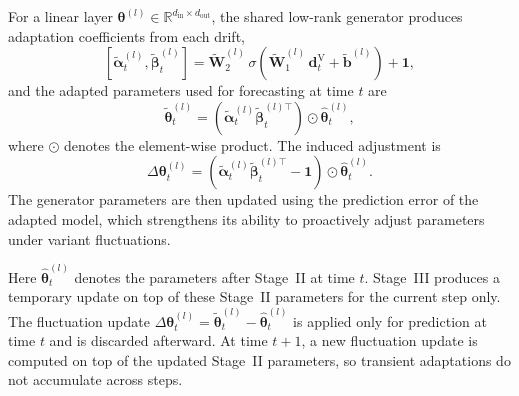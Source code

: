 ﻿\documentclass[journal]{IEEEtran}
\newenvironment{auditproblemblock}{\begingroup\color{red}}{\endgroup}
\begin{document}
\begin{auditproblemblock}
For a linear layer $\boldsymbol{\theta}^{(l)}\in\mathbb{R}^{d_{\mathrm{in}}\times d_{\mathrm{out}}}$, the shared low-rank generator produces adaptation coefficients from each drift,
\begin{equation}
\left[\tilde{\boldsymbol{\alpha}}^{(l)}_t,\tilde{\boldsymbol{\beta}}^{(l)}_t\right]
=\tilde{\mathbf{W}}^{(l)}_2\,\sigma\!\left(\tilde{\mathbf{W}}^{(l)}_1\,\mathbf{d}^{\mathrm{V}}_t+\tilde{\mathbf{b}}^{(l)}\right)+\mathbf{1},
\end{equation}
and the adapted parameters used for forecasting at time $t$ are
\begin{equation}
\tilde{{\boldsymbol{\theta}}}^{(l)}_t=\left(\tilde{\boldsymbol{\alpha}}^{(l)}_t\tilde{\boldsymbol{\beta}}^{(l)\top}_t\right)\odot \widehat{\boldsymbol{\theta}}^{(l)}_t,
\end{equation}
where $\odot$ denotes the element-wise product. The induced adjustment is
\begin{equation}
\Delta\boldsymbol{\theta}^{(l)}_t=\left(\tilde{\boldsymbol{\alpha}}^{(l)}_t\tilde{\boldsymbol{\beta}}^{(l)\top}_t-\mathbf{1}\right)\odot \widehat{\boldsymbol{\theta}}^{(l)}_t.
\end{equation}
The generator parameters are then updated using the prediction error of the adapted model, which strengthens its ability to proactively adjust parameters under variant fluctuations. 

Here $\widehat{\boldsymbol{\theta}}^{(l)}_t$ denotes the parameters after Stage~II at time $t$. Stage~III produces a temporary update on top of these Stage~II parameters for the current step only. The fluctuation update $\Delta\boldsymbol{\theta}^{(l)}_t=\tilde{\boldsymbol{\theta}}^{(l)}_t-\widehat{\boldsymbol{\theta}}^{(l)}_t$ is applied only for prediction at time $t$ and is discarded afterward. At time $t+1$, a new fluctuation update is computed on top of the updated Stage~II parameters, so transient adaptations do not accumulate across steps.
\end{auditproblemblock}
\end{document}
